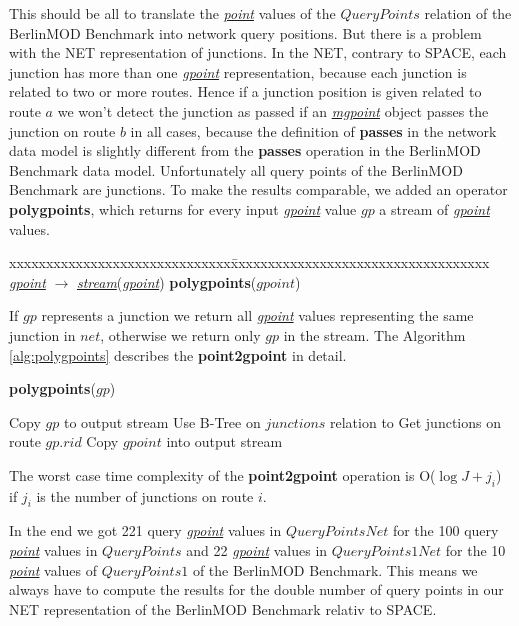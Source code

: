 \documentclass[a4paper]{article}
\newcommand{\bmodb} {BerlinMOD Benchmark}
\newcommand{\op}[1]{\textbf{#1}}
\newcommand{\dt}[1]{\textsl{\underline{#1}}}
\begin{document}
This should be all to translate the \dt{point} values of the $QueryPoints$
relation of the \bmodb{} into network query positions. But there is a problem with
the NET representation of junctions. In the NET, contrary to SPACE, each junction
has more than one \dt{gpoint} representation, because each junction is related to
two or more routes. Hence if a junction position is given related to route $a$
we won't detect the junction as passed if an \dt{mgpoint} object passes the junction
on route $b$ in all cases, because the definition of \op{passes} in the network
data model is slightly different from the \op{passes} operation in the \bmodb{}
data model. Unfortunately all query points of the \bmodb{} are junctions. To make
the results comparable, we added an operator \op{polygpoints}, which returns for
every input \dt{gpoint} value $gp$ a stream of \dt{gpoint} values.
\begin{tabbing}
xxxxxxxxxxxxxxxxxxxxxxxxxxxxxx\=xxxxxxxxxxxxxxxxxxxxxxxxxxxxxxxxxxx\kill
\dt{gpoint} $\rightarrow$ \dt{stream}(\dt{gpoint}) \> \op{polygpoints}($gpoint$)\\
\end{tabbing}
If $gp$ represents a junction
we return all \dt{gpoint} values representing the same junction in $net$,
otherwise we return only $gp$ in the stream. The Algorithm \ref{alg:polygpoints}
describes the \op{point2gpoint} in detail.
\begin{algorithm}
  \caption{\op{polygpoints}($gp$)}
  \label{alg:polygpoints}
  \begin{algorithmic}[1]
    \STATE Copy $gp$ to output stream
    \STATE Use B-Tree on $junctions$ relation to Get junctions on route $gp.rid$
        \STATE Copy $gpoint$ into output stream
      \ENDFOR
    \ENDIF
  \end{algorithmic}
\end{algorithm}
The worst case time complexity of the \op{point2gpoint} operation is
O($\log J + j_i$) if $j_i$ is the number of junctions on route $i$.

In the end we got 221 query \dt{gpoint} values in $QueryPointsNet$ for the 100
query \dt{point} values in $QueryPoints$ and 22 \dt{gpoint} values in
$QueryPoints1Net$ for the 10 \dt{point} values of $QueryPoints1$ of the \bmodb{}.
This means we always have to compute the results for the double number of query
points in our NET representation of the \bmodb{} relativ to SPACE.
\end{document}

